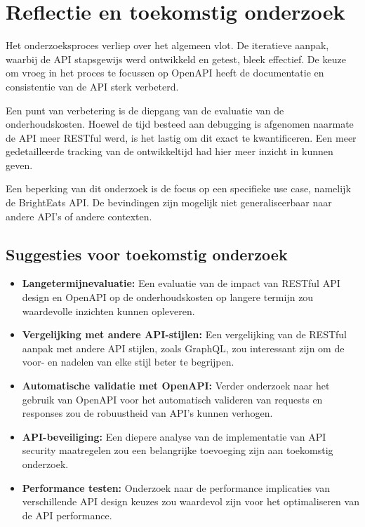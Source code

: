 \section{Reflectie en toekomstig onderzoek}

Het onderzoeksproces verliep over het algemeen vlot. De iteratieve aanpak, waarbij de API stapsgewijs werd ontwikkeld en getest, bleek effectief. De keuze om vroeg in het proces te focussen op OpenAPI heeft de documentatie en consistentie van de API sterk verbeterd.

\bigskip

Een punt van verbetering is de diepgang van de evaluatie van de onderhoudskosten. Hoewel de tijd besteed aan debugging is afgenomen naarmate de API meer RESTful werd, is het lastig om dit exact te kwantificeren. Een meer gedetailleerde tracking van de ontwikkeltijd had hier meer inzicht in kunnen geven.

\bigskip

Een beperking van dit onderzoek is de focus op een specifieke use case, namelijk de Bright\-Eats API. De bevindingen zijn mogelijk niet generaliseerbaar naar andere API's of andere contexten.

\subsection{Suggesties voor toekomstig onderzoek}

\begin{itemize}
  \item \textbf{Langetermijnevaluatie:} Een evaluatie van de impact van RESTful API design en OpenAPI op de onderhoudskosten op langere termijn zou waardevolle inzichten kunnen opleveren.
  \item \textbf{Vergelijking met andere API-stijlen:} Een vergelijking van de RESTful aanpak met andere API stijlen, zoals GraphQL, zou interessant zijn om de voor- en nadelen van elke stijl beter te begrijpen.
  \item \textbf{Automatische validatie met OpenAPI:} Verder onderzoek naar het gebruik van OpenAPI voor het automatisch valideren van requests en responses zou de robuustheid van API's kunnen verhogen.
  \item \textbf{API-beveiliging:} Een diepere analyse van de implementatie van API security maatregelen zou een belangrijke toevoeging zijn aan toekomstig onderzoek.
  \item \textbf{Performance testen:} Onderzoek naar de performance implicaties van verschillende API design keuzes zou waardevol zijn voor het optimaliseren van de API performance.
\end{itemize}

